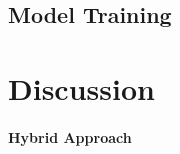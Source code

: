 \documentclass{article}
\begin{document}
        \subsection{Model Training}

	\section{Discussion}

        \paragraph{Hybrid Approach}
\end{document}
